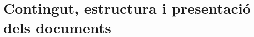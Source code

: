 
\section[Contingut, estructura i presentació]{Contingut, estructura i
  presentació dels documents} \label{ss:separac}

